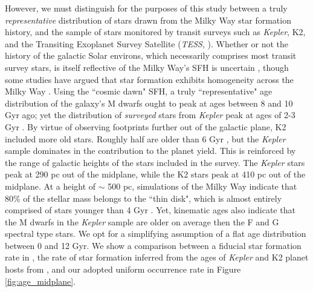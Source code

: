 \documentclass[twocolumn]{aastex631}
\begin{document}
However, we must distinguish for the purposes of this study between a truly \textit{representative} distribution of stars drawn from the Milky Way star formation history, and the sample of stars monitored by transit surveys such as \textit{Kepler}, K2, and the Transiting Exoplanet Survey Satellite (\textit{TESS}, \citealt{Ricker14}).  Whether or not the history of the galactic Solar environs, which necessarily comprises most transit survey stars, is itself reflective of the Milky Way's SFH is uncertain \citep{snaith_reconstructing_2015}, though some studies have argued that star formation exhibits homogeneity across the Milky Way \citep{ness_homogeneity_2022}. Using the ``cosmic dawn" SFH, a truly ``representative" age distribution of the galaxy's M dwarfs ought to peak at ages between 8 and 10 Gyr ago; yet the distribution of \textit{surveyed} stars from \textit{Kepler} peak at ages of 2-3 Gyr \citep{Berger20}.  By virtue of observing footprints further out of the galactic plane, K2 included more old stars. Roughly half are older than 6 Gyr \citep{Berger23}, but the \textit{Kepler} sample dominates in the contribution to the planet yield. This is reinforced by the range of galactic heights of the stars included in the \cite{zink_scaling_2023} survey. The \textit{Kepler} stars peak at 290 pc out of the midplane, while the K2 stars peak at 410 pc out of the midplane. At a height of $\sim$ 500 pc, simulations of the Milky Way indicate that 80\% of the stellar mass belongs to the ``thin disk", which is almost entirely comprised of stars younger than 4 Gyr \citep{ma_structure_2017}. Yet, kinematic ages also indicate that the M dwarfs in the \textit{Kepler} sample are older on average then the F and G spectral type stars. We opt for a simplifying assumption of a flat age distribution between 0 and 12 Gyr. We show a comparison between a fiducial star formation rate in \cite{nidever_tracing_2014}, the rate of star formation inferred from the ages of \textit{Kepler} and K2 planet hosts from \cite{berger_gaia-kepler-tess-host_2023}, and our adopted uniform occurrence rate in Figure \ref{fig:age_midplane}.  
\end{document}
